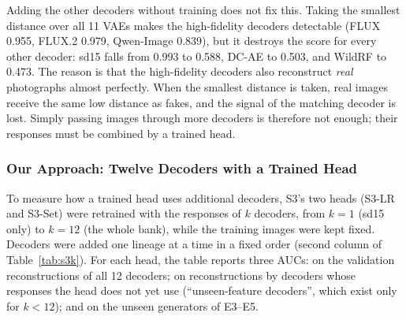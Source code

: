 Adding the other decoders without training does not fix this. Taking the smallest distance over all 11 VAEs makes the high-fidelity decoders detectable (FLUX 0.955, FLUX.2 0.979, Qwen-Image 0.839), but it destroys the score for every other decoder: sd15 falls from 0.993 to 0.588, DC-AE to 0.503, and WildRF to 0.473. The reason is that the high-fidelity decoders also reconstruct \textit{real} photographs almost perfectly. When the smallest distance is taken, real images receive the same low distance as fakes, and the signal of the matching decoder is lost. Simply passing images through more decoders is therefore not enough; their responses must be combined by a trained head.

\subsubsection{Our Approach: Twelve Decoders with a Trained Head}

To measure how a trained head uses additional decoders, S3's two heads (S3-LR and S3-Set) were retrained with the responses of $k$ decoders, from $k=1$ (sd15 only) to $k=12$ (the whole bank), while the training images were kept fixed. Decoders were added one lineage at a time in a fixed order (second column of Table~\ref{tab:s3k}). For each head, the table reports three AUCs: on the validation reconstructions of all 12 decoders; on reconstructions by decoders whose responses the head does not yet use (``unseen-feature decoders'', which exist only for $k<12$); and on the unseen generators of E3--E5.

